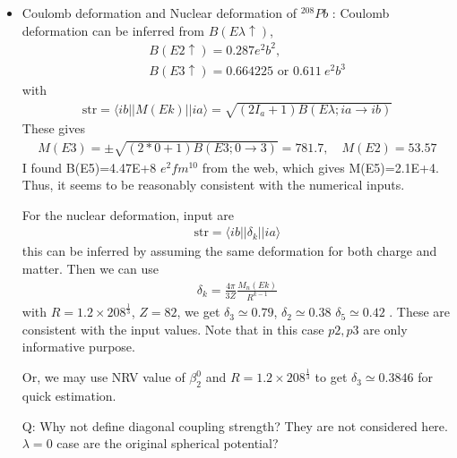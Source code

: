 \documentclass[11pt]{book}
\def\la{\langle}
\def\ra{\rangle}
\newcommand{\bea}{\begin{eqnarray}}
\newcommand{\eea}{\end{eqnarray}}
\newcommand{\no}{\nonumber \\}
\begin{document}
\begin{itemize}
\item Coulomb deformation and Nuclear deformation of $^{208}Pb$ :
       Coulomb deformation can be inferred from $B(E\lambda\uparrow)$,
      \bea 
      & &B(E2\uparrow)=0.287 e^2 b^2,\no 
      & &B(E3\uparrow)=0.664225\mbox{ or }0.611\ e^2 b^3
      \eea 
      with 
      \bea
      \mbox{str} = \la ib||M(Ek)||ia\ra =\sqrt{(2I_a+1) B(E\lambda;ia\to ib)}
      \eea
      These gives
      \bea 
      M(E3)=\pm \sqrt{(2*0+1)B(E3;0\to 3)}= 781.7 ,\quad 
      M(E2)=53.57
      \eea 
      I found
      B(E5)=4.47E+8 $e^2 fm^{10}$ from the web,
      which gives M(E5)=2.1E+4. Thus, it seems to be reasonably consistent
      with the numerical inputs.
      
      For the nuclear deformation, input are
      \bea 
      \mbox{str}=\la ib||\delta_k||ia\ra 
      \eea 
      this can be inferred by assuming the same
      deformation for both charge and matter. 
      Then we can use
      \bea 
      \delta_k=\frac{4\pi}{3Z}\frac{M_n(Ek)}{R^{k-1}}
      \eea 
      with 
      $R=1.2\times 208^{\frac{1}{3}}$, $Z=82$, 
      we get $\delta_3\simeq 0.79$, $\delta_2\simeq 0.38$
      $\delta_5\simeq 0.42$ . 
      These are consistent with the input values.
      Note that in this case $p2,p3$ are only informative purpose. 
      
      Or, we may use NRV value of $\beta_2^0$ and $R=1.2\times 208^{\frac{1}{3}}$
      to get $\delta_3\simeq 0.3846$ for quick estimation. 
      
      Q: Why not define diagonal coupling strength? They are not considered here. 
         $\lambda=0$ case are the original spherical potential? 
      
\end{itemize} 
\end{document}
